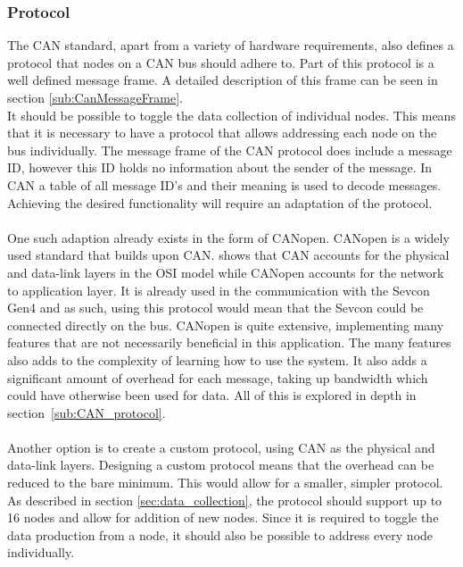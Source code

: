 \subsubsection*{Protocol}
The CAN standard, apart from a variety of hardware requirements, also defines a protocol that nodes on a CAN bus should adhere to.
Part of this protocol is a well defined message frame.
A detailed description of this frame can be seen in section \ref{sub:CanMessageFrame}.\\

It should be possible to toggle the data collection of individual nodes.
This means that it is necessary to have a protocol that allows addressing each node on the bus individually.
The message frame of the CAN protocol does include a message ID, however this ID holds no information about the sender of the message.
In CAN a table of all message ID's and their meaning is used to decode messages.
Achieving the desired functionality will require an adaptation of the protocol. 
\\~\\
One such adaption already exists in the form of CANopen.
CANopen is a widely used standard that builds upon CAN.
\cite{CANopen_introduction} shows that CAN accounts for the physical and data-link layers in the OSI model while CANopen accounts for the network to application layer.
It is already used in the communication with the Sevcon Gen4 and as such, using this protocol would mean that the Sevcon could be connected directly on the bus.
CANopen is quite extensive, implementing many features that are not necessarily beneficial in this application.
The many features also adds to the complexity of learning how to use the system.
It also adds a significant amount of overhead for each message, taking up bandwidth which could have otherwise been used for data. 
All of this is explored in depth in section~\ref{sub:CAN_protocol}.
\\~\\
Another option is to create a custom protocol, using CAN as the physical and data-link layers.
Designing a custom protocol means that the overhead can be reduced to the bare minimum.
This would allow for a smaller, simpler protocol.
As described in section \ref{sec:data_collection}, the protocol should support up to 16 nodes and allow for addition of new nodes.
Since it is required to toggle the data production from a node, it should also be possible to address every node individually.
